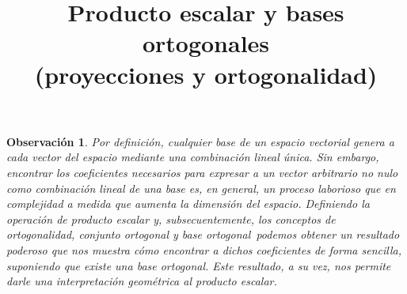 \documentclass[12pt,dvipsnames]{article}
\newtheorem{obs}{Observación}[section]
\numberwithin{equation}{section}
\begin{document}
\title{Producto escalar y bases ortogonales \\ (proyecciones y ortogonalidad)}
\date{}
\maketitle

\begin{obs}
    Por definición, cualquier base de un espacio vectorial genera a cada vector del espacio mediante una combinación lineal única. Sin embargo, encontrar los coeficientes necesarios para expresar a un vector arbitrario no nulo como combinación lineal de una base es, en general, un proceso laborioso que en complejidad a medida que aumenta la dimensión del espacio. Definiendo la operación de producto escalar \textemdash y, subsecuentemente, los conceptos de ortogonalidad, conjunto ortogonal y base ortogonal\textemdash \ podemos obtener un resultado poderoso que nos muestra cómo encontrar a dichos coeficientes de forma sencilla, suponiendo que existe una base ortogonal. Este resultado, a su vez, nos permite darle una interpretación geométrica al producto escalar.
\end{obs}
\end{document}
